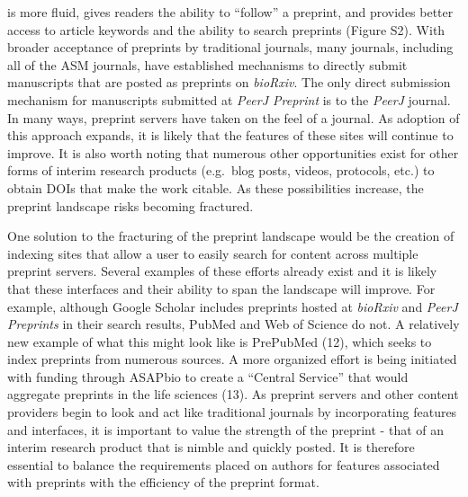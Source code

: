 \documentclass[11pt,]{article}
\begin{document}
is more fluid, gives readers the ability to ``follow'' a preprint, and
provides better access to article keywords and the ability to search
preprints (Figure S2). With broader acceptance of preprints by
traditional journals, many journals, including all of the ASM journals,
have established mechanisms to directly submit manuscripts that are
posted as preprints on \emph{bioRxiv}. The only direct submission
mechanism for manuscripts submitted at \emph{PeerJ Preprint} is to the
\emph{PeerJ} journal. In many ways, preprint servers have taken on the
feel of a journal. As adoption of this approach expands, it is likely
that the features of these sites will continue to improve. It is also
worth noting that numerous other opportunities exist for other forms of
interim research products (e.g.~blog posts, videos, protocols, etc.) to
obtain DOIs that make the work citable. As these possibilities increase,
the preprint landscape risks becoming fractured.

One solution to the fracturing of the preprint landscape would be the
creation of indexing sites that allow a user to easily search for
content across multiple preprint servers. Several examples of these
efforts already exist and it is likely that these interfaces and their
ability to span the landscape will improve. For example, although Google
Scholar includes preprints hosted at \emph{bioRxiv} and \emph{PeerJ
Preprints} in their search results, PubMed and Web of Science do not. A
relatively new example of what this might look like is PrePubMed (12),
which seeks to index preprints from numerous sources. A more organized
effort is being initiated with funding through ASAPbio to create a
``Central Service'' that would aggregate preprints in the life sciences
(13). As preprint servers and other content providers begin to look and
act like traditional journals by incorporating features and interfaces,
it is important to value the strength of the preprint - that of an
interim research product that is nimble and quickly posted. It is
therefore essential to balance the requirements placed on authors for
features associated with preprints with the efficiency of the preprint
format.
\end{document}
